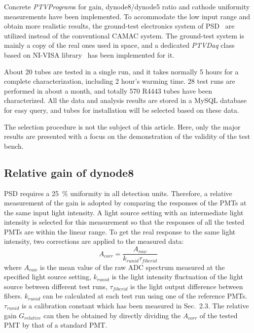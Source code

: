 \documentclass[a4paper,10pt,twoside]{cpc-hepnp}
\begin{document}
\begin{CJK*}{UTF8}{gbsn}
\begin{multicols}{2}
Concrete \textit{PTVProgram}s for gain, dynode8/dynode5 ratio and cathode uniformity measurements have been implemented.
To accommodate the low input range and obtain more realistic results, the ground-test electronics system of PSD~\citep{fee} are utilized instead of the conventional CAMAC system. 
The ground-test system is mainly a copy of the real ones used in space, and a dedicated \textit{PTVDaq} class based on NI-VISA library~\citep{ni_visa} has been implemented for it.

About 20 tubes are tested in a single run, and it takes normally 5 hours for a complete characterization, including 2 hour's warming time. 
28 test runs are performed in about a month, and totally 570 R4443 tubes have been characterized. 
All the data and analysis results are stored in a MySQL database for easy query, and tubes for installation will be selected based on these data.

The selection procedure is not the subject of this article.
Here, only the major results are presented with a focus on the demonstration of the validity of the test bench. 

\subsection{Relative gain of dynode8}
\label{sec:psd_gain}

PSD requires a \SI{25}{\percent} uniformity in all detection units. 
Therefore, a relative measurement of the gain is adopted by comparing the responses of the PMTs at the same input light intensity.
A light source setting with an intermediate light intensity is selected for this measurement so that the responses of all the tested PMTs are within the linear range.    
To get the real response to the same light intensity, two corrections are applied to the measured data:
\begin{equation}
A_{corr} = \frac{A_{raw}}{k_{runid}\tau_{fiberid}}
\end{equation} 
where $A_{raw}$ is the mean value of the raw ADC spectrum measured at the specified light source setting,
$k_{runid}$ is the light intensity fluctuation of the light source between different test runs,
$\tau_{fiberid}$ is the light output difference between fibers.
$k_{runid}$ can be calculated at each test run using one of the reference PMTs.
$\tau_{runid}$ is a calibration constant which has been measured in Sec.~2.3.
The relative gain $G_{relative}$ can then be obtained by directly dividing the $A_{corr}$ of the tested PMT by that of a standard PMT.   


\end{multicols}
\end{CJK*}
\end{document}
